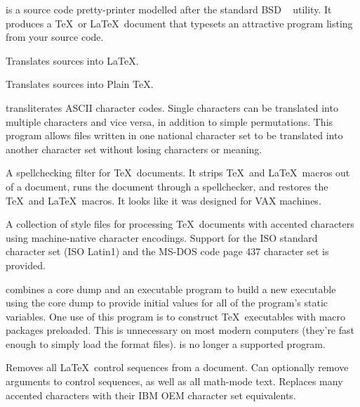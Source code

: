 \newpage
{}

 is a source code pretty-printer modelled after the
standard BSD \Unix\  utility.  It produces a \TeX\
or \LaTeX\ document that typesets an attractive program listing
from your source code.


Translates  sources into \LaTeX.


Translates  sources into Plain \TeX.


 transliterates ASCII character codes.  Single characters
can be translated into multiple characters and vice versa, in addition
to simple permutations.  This program allows files written in one 
national character set to be translated into another character set
without losing characters or meaning.


A spellchecking filter for \TeX\ documents.  It strips \TeX\ and
\LaTeX\ macros out of a document, runs the document through a spellchecker,
and restores the \TeX\ and \LaTeX\ macros.  It looks like it was designed
for VAX machines.


A collection of style files for processing \TeX\ documents with accented
characters using machine-native character encodings.  Support for the
ISO standard character set (ISO Latin1) and the MS-DOS code page 437
character set is provided.


 combines a core dump and an executable program to
build a new executable using the core dump to provide initial values
for all of the program's static variables.  One use of this program
is to construct \TeX\ executables with macro packages preloaded.
This is unnecessary on most modern computers (they're fast enough
to simply load the format files).  \program{undump} is no longer
a supported program.

\newpage
{}

Removes all \LaTeX\ control sequences from a document.  Can optionally
remove arguments to control sequences, as well as all math-mode text.
Replaces many accented characters with their IBM OEM character set
equivalents.

